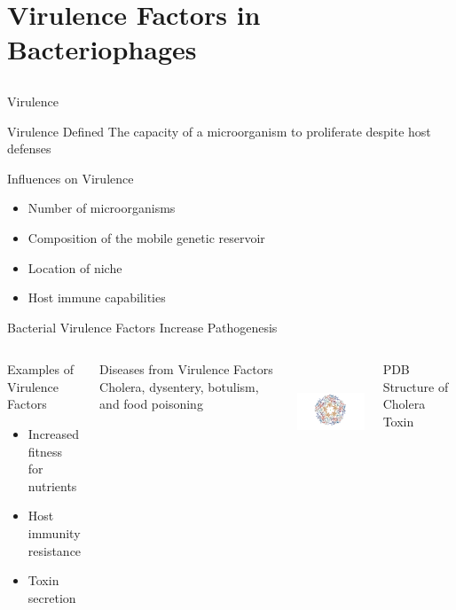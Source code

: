\documentclass[11pt]{beamer}
\begin{document}
	

\section{Virulence Factors in Bacteriophages}
\subsection{}
	
	\begin{frame}{Virulence}
		\begin{block}{Virulence Defined}
		The capacity of a microorganism to proliferate despite host defenses
		\end{block}
		
		\begin{block}{Influences on Virulence}
		\begin{itemize}
		\item Number of microorganisms
		\item \alert{Composition of the mobile genetic reservoir}
		\item Location of niche
		\item Host immune capabilities
		\end{itemize}
		\end{block}
	
	\end{frame}

	\begin{frame}{Bacterial Virulence Factors Increase Pathogenesis}
	\begin{columns}
	\begin{block}{Examples of Virulence Factors}
		\begin{itemize}
		\item Increased fitness for nutrients
		\item Host immunity resistance
		\item Toxin secretion
		\end{itemize}
	\end{block} 
	
	\begin{block}{Diseases from Virulence Factors}
	Cholera, dysentery, botulism, and food poisoning
	\end{block}
	

	\includegraphics[height=3cm, width=5cm]{cholera.png}

	\vspace{-0.3cm}
	\hspace{0.5cm}	
	\tiny{PDB Structure of Cholera Toxin}
	\end{columns}
	
	\end{frame}
	
\end{document}
